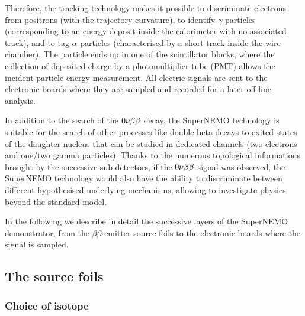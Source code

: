 Therefore, the tracking technology makes it possible to discriminate electrons from positrons (with the trajectory curvature), to identify $\gamma$ particles (corresponding to an energy deposit inside the calorimeter with no associated track), and to tag $\alpha$ particles (characterised by a short track inside the wire chamber).
The particle ends up in one of the scintillator blocks, where the collection of deposited charge by a photomultiplier tube (PMT) allows the incident particle energy measurement.
All electric signals are sent to the electronic boards where they are sampled and recorded for a later off-line analysis.

In addition to the search of the $0\nu\beta\beta$ decay, the SuperNEMO technology is suitable for the search of other processes like double beta decays to exited states of the daughter nucleus that can be studied in dedicated channels (two-electrons and one/two gamma particles).
Thanks to the numerous topological informations brought by the successive sub-detectors, if the $0\nu\beta\beta$ signal was observed, the SuperNEMO technology would also have the ability to discriminate between different hypothesised underlying mechanisms, allowing to investigate physics beyond the standard model.

In the following we describe in detail the successive layers of the SuperNEMO demonstrator, from the $\beta\beta$ emitter source foils to the electronic boards where the signal is sampled.


\subsection{The source foils}

\subsubsection*{Choice of isotope}


